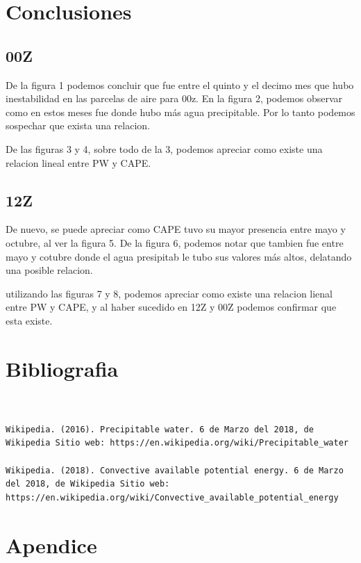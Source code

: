 \documentclass[a4paper]{article}
\begin{document}
\section{Conclusiones}

\subsection{00Z}

De la figura 1 podemos concluir que fue entre el quinto y el decimo mes que hubo inestabilidad en las parcelas de aire para 00z. En la figura 2, podemos observar como en estos meses fue donde hubo más agua precipitable. Por lo tanto podemos sospechar que exista una relacion.
\linebreak

De las figuras 3 y 4, sobre todo de la 3, podemos apreciar como existe una relacion lineal entre PW y CAPE.



\subsection{12Z}

De nuevo, se puede apreciar como CAPE tuvo su mayor presencia entre mayo y octubre, al ver la figura 5. De la figura 6, podemos notar que tambien fue entre mayo y cotubre donde el agua presipitab le tubo sus valores más altos, delatando una posible relacion.
\linebreak

utilizando las figuras 7 y 8, podemos apreciar como existe una relacion lienal entre PW y CAPE, y al haber sucedido en 12Z y 00Z podemos confirmar que esta existe.

\section{Bibliografia}

\begin{verbatim}


Wikipedia. (2016). Precipitable water. 6 de Marzo del 2018, de Wikipedia Sitio web: https://en.wikipedia.org/wiki/Precipitable_water

Wikipedia. (2018). Convective available potential energy. 6 de Marzo del 2018, de Wikipedia Sitio web: https://en.wikipedia.org/wiki/Convective_available_potential_energy

\end{verbatim}

\section{Apendice}
\end{document}
